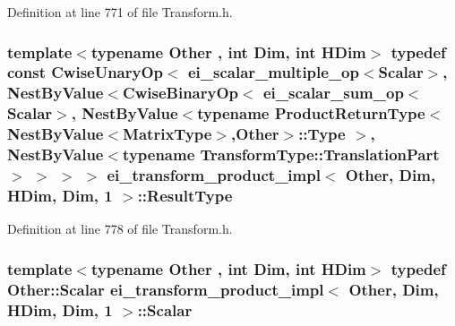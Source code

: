 Definition at line 771 of file Transform.\-h.

\hypertarget{structei__transform__product__impl_3_01_other_00_01_dim_00_01_h_dim_00_01_dim_00_011_01_4_ae26335bd7244467f009fe4529fbea973}{
\subsubsection[{Result\-Type}]{\setlength{\rightskip}{0pt plus 5cm}template$<$typename Other , int Dim, int H\-Dim$>$ typedef const {\bf Cwise\-Unary\-Op}$<$ {\bf ei\-\_\-scalar\-\_\-multiple\-\_\-op}$<${\bf Scalar}$>$, {\bf Nest\-By\-Value}$<${\bf Cwise\-Binary\-Op}$<$ {\bf ei\-\_\-scalar\-\_\-sum\-\_\-op}$<${\bf Scalar}$>$, {\bf Nest\-By\-Value}$<$typename {\bf Product\-Return\-Type}$<${\bf Nest\-By\-Value}$<${\bf Matrix\-Type}$>$,Other$>$\-::Type $>$, {\bf Nest\-By\-Value}$<$typename {\bf Transform\-Type\-::\-Translation\-Part}$>$ $>$ $>$ $>$ {\bf ei\-\_\-transform\-\_\-product\-\_\-impl}$<$ Other, Dim, H\-Dim, Dim, 1 $>$\-::{\bf Result\-Type}}}\label{structei__transform__product__impl_3_01_other_00_01_dim_00_01_h_dim_00_01_dim_00_011_01_4_ae26335bd7244467f009fe4529fbea973}


Definition at line 778 of file Transform.\-h.

\hypertarget{structei__transform__product__impl_3_01_other_00_01_dim_00_01_h_dim_00_01_dim_00_011_01_4_a5c06d7c75fdacd597ae6273085d302a0}{
\subsubsection[{Scalar}]{\setlength{\rightskip}{0pt plus 5cm}template$<$typename Other , int Dim, int H\-Dim$>$ typedef Other\-::\-Scalar {\bf ei\-\_\-transform\-\_\-product\-\_\-impl}$<$ Other, Dim, H\-Dim, Dim, 1 $>$\-::{\bf Scalar}}}\label{structei__transform__product__impl_3_01_other_00_01_dim_00_01_h_dim_00_01_dim_00_011_01_4_a5c06d7c75fdacd597ae6273085d302a0}


